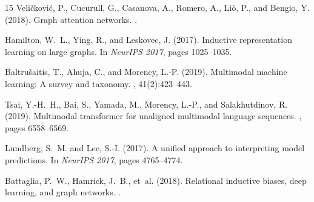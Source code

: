 \documentclass[11pt,a4paper]{article}
\begin{document}
\begin{thebibliography}{15}
Veli{\v{c}}kovi{\'c}, P., Cucurull, G., Casanova, A., Romero, A., Li{\`o}, P., and Bengio, Y. (2018).
\newblock Graph attention networks.
.

Hamilton, W.~L., Ying, R., and Leskovec, J. (2017).
\newblock Inductive representation learning on large graphs.
\newblock In {\em NeurIPS 2017}, pages 1025--1035.

Baltru{\v{s}}aitis, T., Ahuja, C., and Morency, L.-P. (2019).
\newblock Multimodal machine learning: A survey and taxonomy.
, 41(2):423--443.

Tsai, Y.-H.~H., Bai, S., Yamada, M., Morency, L.-P., and Salakhutdinov, R. (2019).
\newblock Multimodal transformer for unaligned multimodal language sequences.
, pages 6558--6569.

Lundberg, S.~M. and Lee, S.-I. (2017).
\newblock A unified approach to interpreting model predictions.
\newblock In {\em NeurIPS 2017}, pages 4765--4774.

Battaglia, P.~W., Hamrick, J.~B., et~al. (2018).
\newblock Relational inductive biases, deep learning, and graph networks.
.

\end{thebibliography}
\end{document}
